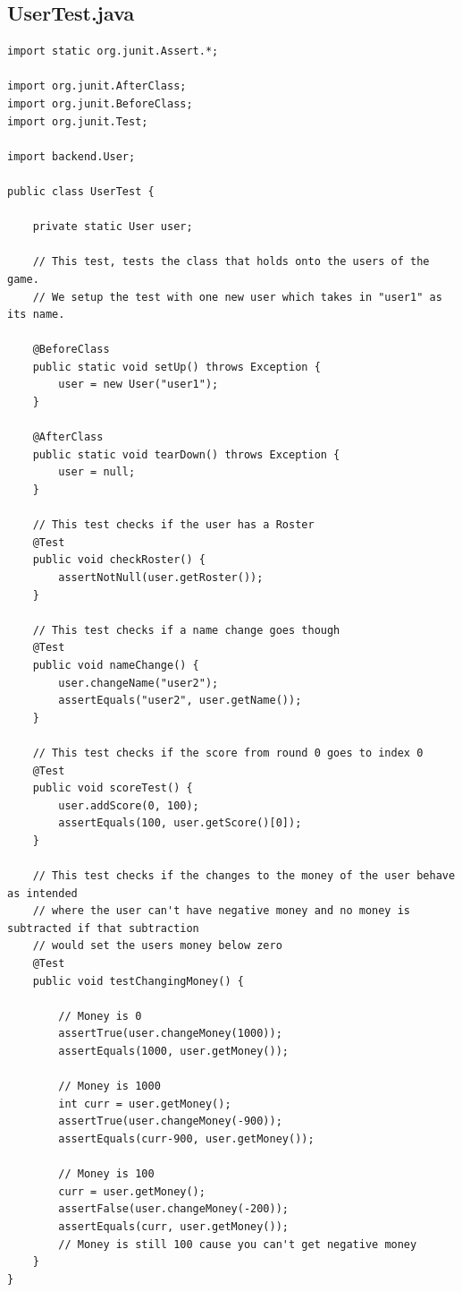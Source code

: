 \documentclass{article}
\begin{document}
\subsection*{UserTest.java}
\begin{lstlisting}
import static org.junit.Assert.*;

import org.junit.AfterClass;
import org.junit.BeforeClass;
import org.junit.Test;

import backend.User;

public class UserTest {
	
	private static User user;

	// This test, tests the class that holds onto the users of the game.
	// We setup the test with one new user which takes in "user1" as its name.
	
	@BeforeClass
	public static void setUp() throws Exception {
		user = new User("user1");
	}

	@AfterClass
	public static void tearDown() throws Exception {
		user = null;
	}
	
	// This test checks if the user has a Roster
	@Test
	public void checkRoster() {
		assertNotNull(user.getRoster());
	}
	
	// This test checks if a name change goes though
	@Test 
	public void nameChange() {
		user.changeName("user2");
		assertEquals("user2", user.getName());
	}
	
	// This test checks if the score from round 0 goes to index 0
	@Test
	public void scoreTest() {
		user.addScore(0, 100);
		assertEquals(100, user.getScore()[0]);
	}
	
	// This test checks if the changes to the money of the user behave as intended
	// where the user can't have negative money and no money is subtracted if that subtraction 
	// would set the users money below zero
	@Test
	public void testChangingMoney() {
		
		// Money is 0
		assertTrue(user.changeMoney(1000));
		assertEquals(1000, user.getMoney());
		
		// Money is 1000
		int curr = user.getMoney();
		assertTrue(user.changeMoney(-900));
		assertEquals(curr-900, user.getMoney());
		
		// Money is 100
		curr = user.getMoney();
		assertFalse(user.changeMoney(-200));
		assertEquals(curr, user.getMoney());
		// Money is still 100 cause you can't get negative money
	}
}
\end{lstlisting}
\end{document}
